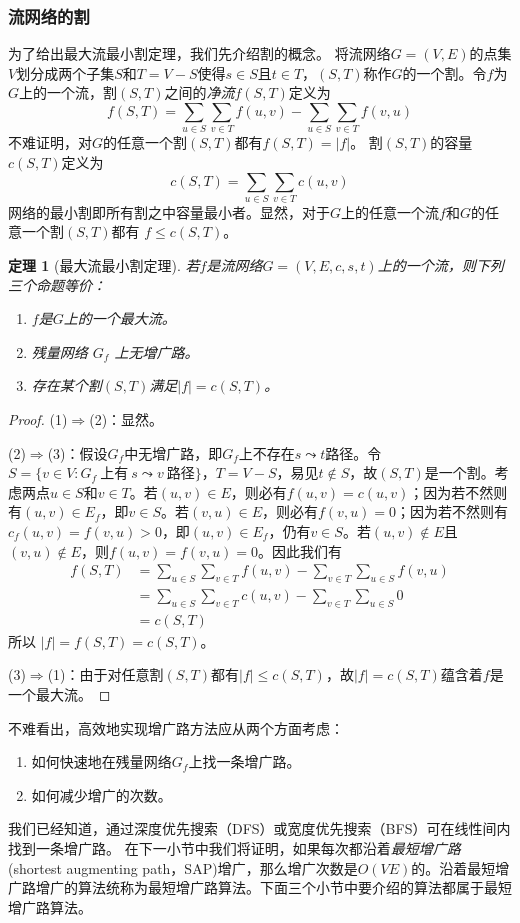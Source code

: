 \documentclass[a4paper]{ctexbook}
\newtheorem{theorem}{定理}[chapter] %
\begin{document}
  \subsubsection*{流网络的割}
  为了给出最大流最小割定理，我们先介绍割的概念。
  将流网络$G=(V,E)$的点集$V$划分成两个子集$S$和$T=V-S$使得$s\in S$且$t\in T$，$(S,T)$称作$G$的一个割。令$f$为$G$上的一个流，割$(S,T)$之间的\emph{净流}$f(S,T)$定义为
  \[
  f(S,T) = \sum_{u\in S}\sum_{v\in T}f(u,v) - \sum_{u\in S}\sum_{v\in T}f(v,u)
  \]
  不难证明，对$G$的任意一个割$(S,T)$都有$f(S,T) = |f|$。
  割$(S,T)$的容量$c(S,T)$定义为
  \[
  c(S,T) = \sum_{u\in S}\sum_{v\in T}c(u,v)
  \]
  网络的最小割即所有割之中容量最小者。显然，对于$G$上的任意一个流$f$和$G$的任意一个割$(S,T)$都有 $f \le c(S,T)$。
  \begin{theorem}[最大流最小割定理]
    若$f$是流网络$G=(V,E,c,s,t)$上的一个流，则下列三个命题等价：
    \begin{enumerate}
      \item $f$是$G$上的一个最大流。
      \item 残量网络 $G_f$ 上无增广路。
      \item 存在某个割$(S,T)$满足$|f| = c(S,T)$。
    \end{enumerate}
  \end{theorem}
  \begin{proof}
    (1)$\Rightarrow$(2)：显然。

    (2)$\Rightarrow$(3)：假设$G_f$中无增广路，即$G_f$上不存在$s\leadsto t$路径。令$S=\{v\in V\colon G_f\ \text{上有}\ s\leadsto v\ \text{路径}\}$，$T=V-S$，易见$t\notin S$，故$(S,T)$是一个割。考虑两点$u\in S$和$v\in T$。若$(u,v)\in E$，则必有$f(u,v)=c(u,v)$；因为若不然则有$(u,v)\in E_f$，即$v\in S$。若$(v,u)\in E$，则必有$f(v,u)=0$；因为若不然则有$c_f(u,v) = f(v,u) > 0$，即$(u,v)\in E_f$，仍有$v \in S$。若$(u,v)\notin E$且$(v,u)\notin E$，则$f(u,v)=f(v,u)=0$。因此我们有
    \begin{align*}
        f(S,T) &= \sum_{u\in S}\sum_{v\in T}f(u,v) - \sum_{v\in T}\sum_{u\in S}f(v,u)\\
        &= \sum_{u\in S}\sum_{v\in T}c(u,v) - \sum_{v\in T}\sum_{u\in S}0\\
        &= c(S, T)
    \end{align*}
    所以 $|f| = f(S,T) = c(S, T)$。

    (3)$\Rightarrow$(1)：由于对任意割$(S,T)$都有$|f|\le c(S,T)$，故$|f|=c(S,T)$蕴含着$f$是一个最大流。
  \end{proof}

  不难看出，高效地实现增广路方法应从两个方面考虑：
  \begin{enumerate}
    \item 如何快速地在残量网络$G_f$上找一条增广路。\label{Approach:1}
    \item 如何减少增广的次数。\label{Approach:2}
  \end{enumerate}
  我们已经知道，通过深度优先搜索（DFS）或宽度优先搜索（BFS）可在线性间内找到一条增广路。
  在下一小节中我们将证明，如果每次都沿着\emph{最短增广路}(shortest augmenting path，SAP)增广，那么增广次数是$O(VE)$的。沿着最短增广路增广的算法统称为最短增广路算法。下面三个小节中要介绍的算法都属于最短增广路算法。
\end{document}

